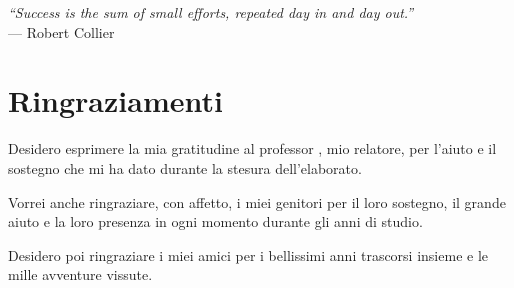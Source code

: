 \cleardoublepage
{}
{}

\begin{flushright}{
    \slshape
    ``Success is the sum of small efforts, repeated day in and day out.''} \\
    \medskip
    --- Robert Collier
\end{flushright}

\begingroup
\let\clearpage\relax
\let\cleardoublepage\relax
\let\cleardoublepage\relax

\chapter*{Ringraziamenti}

\noindent Desidero esprimere la mia gratitudine al professor \myProf, mio relatore, per l'aiuto e il sostegno che mi ha dato durante la stesura dell'elaborato.

\vspace{0.35cm}

\noindent Vorrei anche ringraziare, con affetto, i miei genitori per il loro sostegno, il grande aiuto e la loro presenza in ogni momento durante gli anni di studio.

\vspace{0.35cm}

\noindent Desidero poi ringraziare i miei amici per i bellissimi anni trascorsi insieme e le mille avventure vissute.

\vspace{0.75cm}

\noindent{\myLocation, \myTime}
\hfill \textit{\myName}

\endgroup
